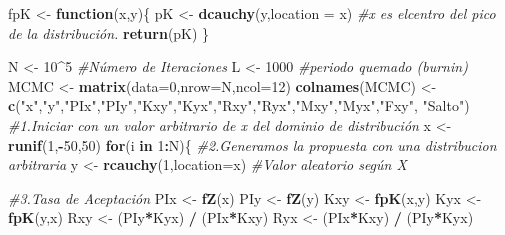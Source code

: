 \documentclass[
]{article}
\newenvironment{Shaded}{\begin{snugshade}}{\end{snugshade}}
\newcommand{\AttributeTok}[1]{\textcolor[rgb]{0.13,0.29,0.53}{#1}}
\newcommand{\CommentTok}[1]{\textcolor[rgb]{0.56,0.35,0.01}{\textit{#1}}}
\newcommand{\ControlFlowTok}[1]{\textcolor[rgb]{0.13,0.29,0.53}{\textbf{#1}}}
\newcommand{\DecValTok}[1]{\textcolor[rgb]{0.00,0.00,0.81}{#1}}
\newcommand{\FunctionTok}[1]{\textcolor[rgb]{0.13,0.29,0.53}{\textbf{#1}}}
\newcommand{\NormalTok}[1]{#1}
\newcommand{\OtherTok}[1]{\textcolor[rgb]{0.56,0.35,0.01}{#1}}
\newcommand{\SpecialCharTok}[1]{\textcolor[rgb]{0.81,0.36,0.00}{\textbf{#1}}}
\newcommand{\StringTok}[1]{\textcolor[rgb]{0.31,0.60,0.02}{#1}}
\begin{document}
\begin{Shaded}
\begin{Highlighting}[]
\NormalTok{fpK }\OtherTok{\textless{}{-}} \ControlFlowTok{function}\NormalTok{(x,y)\{ }
\NormalTok{  pK }\OtherTok{\textless{}{-}} \FunctionTok{dcauchy}\NormalTok{(y,}\AttributeTok{location =}\NormalTok{ x) }\CommentTok{\#x es elcentro del pico de la distribución. }
  \FunctionTok{return}\NormalTok{(pK) }
\NormalTok{\} }

\NormalTok{N }\OtherTok{\textless{}{-}} \DecValTok{10}\SpecialCharTok{\^{}}\DecValTok{5} \CommentTok{\#Número de Iteraciones }
\NormalTok{L }\OtherTok{\textless{}{-}} \DecValTok{1000} \CommentTok{\#periodo quemado (burnin) }
\NormalTok{MCMC }\OtherTok{\textless{}{-}} \FunctionTok{matrix}\NormalTok{(}\AttributeTok{data=}\DecValTok{0}\NormalTok{,}\AttributeTok{nrow=}\NormalTok{N,}\AttributeTok{ncol=}\DecValTok{12}\NormalTok{) }
\FunctionTok{colnames}\NormalTok{(MCMC) }\OtherTok{\textless{}{-}} \FunctionTok{c}\NormalTok{(}\StringTok{"x"}\NormalTok{,}\StringTok{"y"}\NormalTok{,}\StringTok{"PIx"}\NormalTok{,}\StringTok{"PIy"}\NormalTok{,}\StringTok{"Kxy"}\NormalTok{,}\StringTok{"Kyx"}\NormalTok{,}\StringTok{"Rxy"}\NormalTok{,}\StringTok{"Ryx"}\NormalTok{,}\StringTok{"Mxy"}\NormalTok{,}\StringTok{"Myx"}\NormalTok{,}\StringTok{"Fxy"}\NormalTok{,}
                  \StringTok{"Salto"}\NormalTok{) }
\CommentTok{\#1.Iniciar con un valor arbitrario de x del dominio de distribución }
\NormalTok{x }\OtherTok{\textless{}{-}} \FunctionTok{runif}\NormalTok{(}\DecValTok{1}\NormalTok{,}\SpecialCharTok{{-}}\DecValTok{50}\NormalTok{,}\DecValTok{50}\NormalTok{)}
\ControlFlowTok{for}\NormalTok{(i }\ControlFlowTok{in} \DecValTok{1}\SpecialCharTok{:}\NormalTok{N)\{ }
  \CommentTok{\#2.Generamos la propuesta con una distribucion arbitraria }
\NormalTok{  y }\OtherTok{\textless{}{-}} \FunctionTok{rcauchy}\NormalTok{(}\DecValTok{1}\NormalTok{,}\AttributeTok{location=}\NormalTok{x) }\CommentTok{\#Valor aleatorio según X }
  
  \CommentTok{\#3.Tasa de Aceptación }
\NormalTok{  PIx }\OtherTok{\textless{}{-}} \FunctionTok{fZ}\NormalTok{(x) }
\NormalTok{  PIy }\OtherTok{\textless{}{-}} \FunctionTok{fZ}\NormalTok{(y) }
\NormalTok{  Kxy }\OtherTok{\textless{}{-}} \FunctionTok{fpK}\NormalTok{(x,y) }
\NormalTok{  Kyx }\OtherTok{\textless{}{-}} \FunctionTok{fpK}\NormalTok{(y,x) }
\NormalTok{  Rxy }\OtherTok{\textless{}{-}}\NormalTok{ (PIy}\SpecialCharTok{*}\NormalTok{Kyx) }\SpecialCharTok{/}\NormalTok{ (PIx}\SpecialCharTok{*}\NormalTok{Kxy) }
\NormalTok{  Ryx }\OtherTok{\textless{}{-}}\NormalTok{ (PIx}\SpecialCharTok{*}\NormalTok{Kxy) }\SpecialCharTok{/}\NormalTok{ (PIy}\SpecialCharTok{*}\NormalTok{Kyx) }
  

\end{Highlighting}
\end{Shaded}
\end{document}

